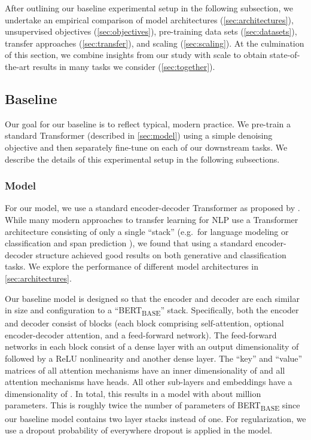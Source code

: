 \documentclass[twoside,11pt]{article}
\begin{document}
After outlining our baseline experimental setup in the following subsection, we undertake an empirical comparison of model architectures (\cref{sec:architectures}), unsupervised objectives (\cref{sec:objectives}), pre-training data sets (\cref{sec:datasets}), transfer approaches (\cref{sec:transfer}), and scaling (\cref{sec:scaling}).
At the culmination of this section, we combine insights from our study with scale to obtain state-of-the-art results in many tasks we consider (\cref{sec:together}).

\subsection{Baseline}
\label{sec:baseline}

Our goal for our baseline is to reflect typical, modern practice.
We pre-train a standard Transformer (described in \cref{sec:model}) using a simple denoising objective and then separately fine-tune on each of our downstream tasks.
We describe the details of this experimental setup in the following subsections.

\subsubsection{Model}
\label{sec:model_hparams}

For our model, we use a standard encoder-decoder Transformer as proposed by \cite{vaswani2017attention}.
While many modern approaches to transfer learning for NLP use a Transformer architecture consisting of only a single ``stack'' (e.g.\ for language modeling \citep{radford2018improving,dong2019unified} or classification and span prediction \citep{devlin2018bert,yang2019xlnet}), we found that using a standard encoder-decoder structure achieved good results on both generative and classification tasks.
We explore the performance of different model architectures in \cref{sec:architectures}.

Our baseline model is designed so that the encoder and decoder are each similar in size and configuration to a ``BERT\textsubscript{BASE}'' \citep{devlin2018bert} stack.
Specifically, both the encoder and decoder consist of  blocks (each block comprising self-attention, optional encoder-decoder attention, and a feed-forward network).
The feed-forward networks in each block consist of a dense layer with an output dimensionality of  followed by a ReLU nonlinearity and another dense layer.
The ``key'' and ``value'' matrices of all attention mechanisms have an inner dimensionality of  and all attention mechanisms have  heads.
All other sub-layers and embeddings have a dimensionality of .
In total, this results in a model with about  million parameters.
This is roughly twice the number of parameters of BERT\textsubscript{BASE} since our baseline model contains two layer stacks instead of one.
For regularization, we use a dropout probability of  everywhere dropout is applied in the model.
\end{document}
